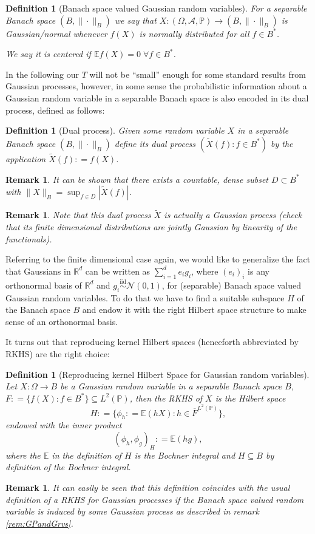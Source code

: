 \documentclass[11pt,reqno]{amsart}
\numberwithin{equation}{section}
\newtheorem{defi}[thm]{Definition}
\newtheorem{rem}[thm]{Remark}
\newcommand{\deq}{\mathrel{\mathop:}=}
\newcommand{\iidnormal}{\mathrel{\stackrel{\text{iid}}{\sim}}\mathcal N(0,1)}
\begin{document}
\begin{defi}[Banach space valued Gaussian random variables]
	For a separable Banach space $(B,\|\cdot\|_B)$ we say that $X:(\Omega,\mathcal A,\mathbb P)\rightarrow(B,\|\cdot\|_B)$ is Gaussian/normal whenever $f(X)$ is normally distributed for all $f\in B^*$.
	
	We say it is centered if $\mathbb E f(X)=0\; \forall f\in B^*$.
\end{defi}

In the following our $T$ will not be ``small'' enough for some standard results from Gaussian processes, however, in some sense the probabilistic information about a Gaussian random variable in a separable Banach space is also encoded in its dual process, defined as follows:

\begin{defi}[Dual process]
	Given some random variable $X$ in a separable Banach space $(B,\|\cdot\|_B)$ define its dual process $(\tilde X(f): f\in B^*)$ by the application $\tilde X(f)\deq f(X)$.
\end{defi}

\begin{rem}
	It can be shown that there exists a countable, dense subset $D\subset B^*$ with $\|X\|_B = \sup_{f\in D}|\tilde X(f)|$.
\end{rem}

\begin{rem}
	Note that this dual process $\tilde X$ is actually a Gaussian process (check that its finite dimensional distributions are \emph{jointly} Gaussian by linearity of the functionals).
\end{rem}

Referring to the finite dimensional case again, we would like to generalize the fact that Gaussians in $\mathbb R^d$ can be written as $\sum_{i=1}^d e_ig_i$, where $(e_i)_i$ is any orthonormal basis of $\mathbb R^d$ and $g_i\iidnormal$, for (separable) Banach space valued Gaussian random variables. To do that we have to find a suitable subspace $H$ of the Banach space $B$ and endow it with the right Hilbert space structure to make sense of an orthonormal basis.

It turns out that reproducing kernel Hilbert spaces (henceforth abbreviated by RKHS) are the right choice:

\begin{defi}[Reproducing kernel Hilbert Space for Gaussian random variables]
	Let $X:\Omega\rightarrow B$ be a Gaussian random variable in a separable Banach space $B$, $F\deq\{f(X):f\in B^*\}\subseteq L^2(\mathbb P)$, then the RKHS of $X$ is the Hilbert space $$H\deq\{\phi_h\deq\mathbb E(hX): h\in\overline F^{L^2(\mathbb P)}\},$$
	endowed with the inner product
	$$(\phi_h,\phi_g)_H\deq\mathbb E(hg),$$
	where the $\mathbb E$ in the definition of $H$ is the Bochner integral and $H\subseteq B$ by definition of the Bochner integral.
\end{defi}
\begin{rem}
	It can easily be seen that this definition coincides with the usual definition of a RKHS for Gaussian processes if the Banach space valued random variable is induced by some Gaussian process as described in remark \ref{rem:GPandGrvs}.
\end{rem}
\end{document}
